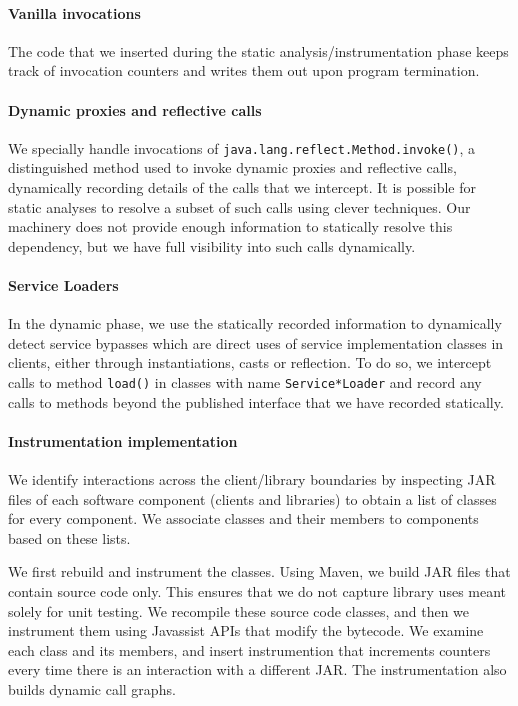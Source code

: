 \paragraph{Vanilla invocations} The code that we inserted during the
static analysis/instrumentation phase keeps track of invocation counters
and writes them out upon program termination.

\paragraph{Dynamic proxies and reflective calls}
We specially handle invocations of
\texttt{java.lang.reflect.Method.invoke()}, a distinguished method
used to invoke dynamic proxies and reflective calls, dynamically
recording details of the calls that we intercept. It is possible for
static analyses to resolve a subset of such calls using clever
techniques. Our machinery does not provide enough information to
statically resolve this dependency, but we have full visibility into
such calls dynamically.

\paragraph{Service Loaders} In the dynamic phase, we use the statically recorded information to dynamically detect service bypasses which are direct uses of service implementation 
classes in clients, either through instantiations, casts or reflection. To do so, we intercept calls 
to method \texttt{load()} in classes with name \texttt{Service*Loader} and record any calls to methods beyond 
the published interface that we have recorded statically.

\paragraph{Instrumentation implementation}
We identify interactions across the client/library boundaries by
inspecting JAR files of each software component (clients and
libraries) to obtain a list of classes for every component. We
associate classes and their members to components based on these
lists. 

We first rebuild and instrument the classes. Using Maven, we build JAR
files that contain source code only. This ensures that we do not
capture library uses meant solely for unit testing.  We recompile
these source code classes, and then we instrument them using Javassist
APIs that modify the bytecode. We examine each class and its members,
and insert instrumention that increments counters every time there is
an interaction with a different JAR. The instrumentation also builds
dynamic call graphs.

